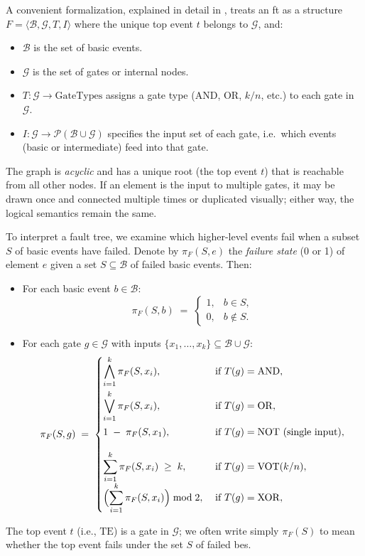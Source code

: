 A convenient formalization, explained in detail in \cite{ruijters_fault_2015}, treats an \acrshort{ft} as a structure \(F = \langle \mathcal{B}, \mathcal{G}, T, I \rangle\) where the unique top event \(t\) belongs to \(\mathcal{G}\), and:

\begin{itemize}
\item \(\mathcal{B}\) is the set of basic events. 
\item \(\mathcal{G}\) is the set of gates or internal nodes.
\item \(T: \mathcal{G} \to \text{GateTypes}\) assigns a gate type (AND, OR, \(k/n\), etc.) to each gate in \(\mathcal{G}\).  
\item \(I: \mathcal{G} \to \mathcal{P}(\mathcal{B} \cup \mathcal{G})\) specifies the input set of each gate, i.e.\ which events (basic or intermediate) feed into that gate.  
\end{itemize}

The graph is \emph{acyclic} and has a unique root (the top event \(t\)) that is reachable from all other nodes. If an element is the input to multiple gates, it may be drawn once and connected multiple times or duplicated visually; either way, the logical semantics remain the same.

To interpret a fault tree, we examine which higher-level events fail when a subset \(S\) of basic events have failed. Denote by \(\pi_F(S, e)\) the \emph{failure state} (0 or 1) of element \(e\) given a set \(S\subseteq \mathcal{B}\) of failed basic events. Then:

\begin{itemize}
\item For each basic event \(b \in \mathcal{B}\):
  \[
    \pi_F(S, b) \;=\;
    \begin{cases}
      1, & b \in S,\\
      0, & b \notin S.
    \end{cases}
  \]
\item For each gate \(g \in \mathcal{G}\) with inputs \(\{x_1,\dots,x_k\}\subseteq \mathcal{B}\cup\mathcal{G}\):
  \[
  \pi_F(S,g) 
  \;=\;
  \begin{cases}
  \displaystyle
    \bigwedge_{i=1}^k \pi_F(S, x_i),
    & \;\text{if }T(g)=\mathrm{AND},\\[1.2em]
  \displaystyle
    \bigvee_{i=1}^k \pi_F(S, x_i),
    & \;\text{if }T(g)=\mathrm{OR},\\[1.2em]
  \displaystyle
    1 \;-\; \pi_F(S, x_1),
    & \;\text{if }T(g)=\mathrm{NOT} \text{ (single input)},\\[1.2em]
  \displaystyle
    \sum_{i=1}^k \pi_F(S,x_i)\;\ge\;k,
    & \;\text{if }T(g)=\mathrm{VOT}(k/n),\\
  \displaystyle
    \Bigl(\sum_{i=1}^k \pi_F(S,x_i)\Bigr)\bmod 2,
    & \;\text{if }T(g)=\mathrm{XOR} ,\\[0.6em]
  \end{cases}
  \]
\end{itemize}
The top event \(t\) (i.e., \(\mathrm{TE}\)) is a gate in \(\mathcal{G}\); we often write simply \(\pi_F(S)\) to mean whether the top event fails under the set \(S\) of failed \acrshort{be}s.